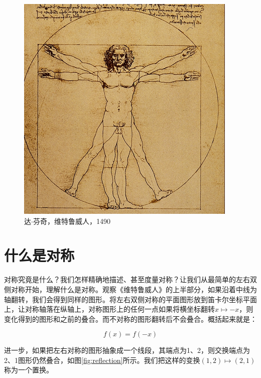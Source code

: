 \documentclass[b5paper]{ctexart}
\begin{document}
\begin{figure}[htbp]
 \centering
 \includegraphics[scale=0.35]{img/vitruvian-man.png}
 \captionsetup{labelformat=empty}
 \caption{达$\cdot$芬奇，维特鲁威人，1490}
\end{figure}

\section{什么是对称}
对称究竟是什么？我们怎样精确地描述、甚至度量对称？让我们从最简单的左右双侧对称开始，理解什么是对称。观察《维特鲁威人》的上半部分，如果沿着中线为轴翻转，我们会得到同样的图形。将左右双侧对称的平面图形放到笛卡尔坐标平面上，让对称轴落在纵轴上，对称图形上的任何一点如果将横坐标翻转$x \mapsto -x$，则变化得到的图形和之前的叠合。而不对称的图形翻转后不会叠合。概括起来就是：

\[
f(x) = f(-x)
\]

进一步，如果把左右对称的图形抽象成一个线段，其端点为1、2，则交换端点为2、1图形仍然叠合，如图\ref{fig:reflection}所示。我们把这样的变换$(1, 2) \mapsto (2, 1)$称为一个置换。
\end{document}
